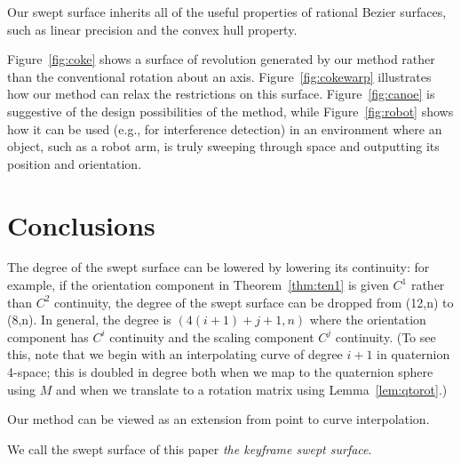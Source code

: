 Our swept surface inherits all of the useful properties of rational Bezier
surfaces, such as linear precision and the convex hull property.

\begin{example}
Figure~\ref{fig:coke} shows a surface of revolution generated
by our method rather than the conventional rotation about an axis.
Figure~\ref{fig:cokewarp} illustrates how our method can relax the
restrictions on this surface.
Figure~\ref{fig:canoe} is suggestive of the design
possibilities of the method,
while Figure~\ref{fig:robot} shows how it can be used (e.g., for 
interference detection) in an environment
where an object, such as a robot arm, is truly sweeping through space
and outputting its position and orientation.
\end{example}




\section{Conclusions}

The degree of the swept surface can be lowered by lowering its
continuity: for example, if the orientation component
in Theorem~\ref{thm:ten1} is given $C^1$ rather than $C^2$ continuity, 
the degree of the swept surface can be dropped from (12,n) to (8,n).
In general, the degree is $(4(i+1)+j+1,n)$ where the orientation
component has $C^i$ continuity and the scaling component $C^j$ continuity.
(To see this, note that we begin with an interpolating curve of degree $i+1$
in quaternion 4-space; this is doubled in degree both when we map to the 
quaternion sphere using $M$ and when we translate to a rotation matrix
using Lemma~\ref{lem:qtorot}.)

Our method can be viewed as an extension from point to curve interpolation.

We call the swept surface of this paper
{\em the keyframe swept surface}.




